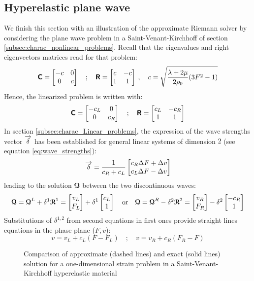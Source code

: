 \subsection{Hyperelastic plane wave}
We finish this section with an illustration of the approximate Riemann solver by considering the plane wave problem in a Saint-Venant-Kirchhoff of section \ref{subsec:charac_nonlinear_problems}.
Recall that the eigenvalues and right eigenvectors matrices read for that problem:
\begin{equation}
  \label{eq:SVK_matrices}
  \boldsymbol{\mathsf{C}} = \left[\begin{matrix}-c & 0 \\ 0 & c\end{matrix}\right] \quad ; \quad \boldsymbol{\mathsf{R}} = \left[\begin{matrix}c & -c\\ 1&1\end{matrix}\right] \:,\quad c=\sqrt{\frac{\lambda + 2\mu}{2\rho_0}(3F^2-1)}
\end{equation}
Hence, the linearized problem is written with:
\begin{equation}
  \label{eq:SVK_matrices_linear}
  \boldsymbol{\mathsf{C}} = \left[\begin{matrix}-c_L & 0 \\ 0 & c_R\end{matrix}\right] \quad ; \quad \boldsymbol{\mathsf{R}} = \left[\begin{matrix}c_L & -c_R\\ 1&1\end{matrix}\right]
\end{equation}
In section \ref{subsec:charac_Linear_problems}, the expression of the wave strengths vector ${\overrightarrow{\delta}}$ has been established for general linear systems of dimension $2$ (see equation \eqref{eq:wave_strengths}):
\begin{equation}
  {\overrightarrow{\delta}}=\frac{1}{c_R+c_L}\left[\begin{matrix}c_R \Delta F +\Delta v\\ c_L \Delta F -\Delta v\end{matrix}\right]
\end{equation}
leading to the solution ${\boldsymbol{\mathcal{Q}}} $ between the two discontinuous waves:
\begin{equation}
  \label{eq:SVK_approx_solution}
  {\boldsymbol{\mathcal{Q}}}  = {\boldsymbol{\mathcal{Q}}}^L + \delta^1 {\boldsymbol{\mathcal{R}}}^1 = \left[\begin{matrix}v_L \\F_L\end{matrix}\right] +\delta^1 \left[\begin{matrix}c_L \\1\end{matrix}\right] \quad \text{or} \quad {\boldsymbol{\mathcal{Q}}}  = {\boldsymbol{\mathcal{Q}}}^R - \delta^2 {\boldsymbol{\mathcal{R}}}^2 = \left[\begin{matrix}v_R \\F_R\end{matrix}\right] -\delta^2 \left[\begin{matrix}-c_R \\1\end{matrix}\right]
\end{equation}
Substitutions of $\delta^{1,2}$ from second equations in first ones provide straight lines equations in the phase plane ($F,v$):
\begin{equation}
  \label{eq:approx_straight}
  v  = v_L + c_L(F -F_L) \quad ; \quad v  = v_R + c_R(F_R-F )
\end{equation}
\begin{figure}[h!]
  \centering
  {  \label{subfig:SVK_Approx1}}
  {  \label{subfig:SVK_Approx4}}
  \caption{Comparison of approximate (dashed lines) and exact (solid lines) solution for a one-dimensional strain problem in a Saint-Venant-Kirchhoff hyperelastic material}
  \label{fig:comparison_exact_approx}
\end{figure}
